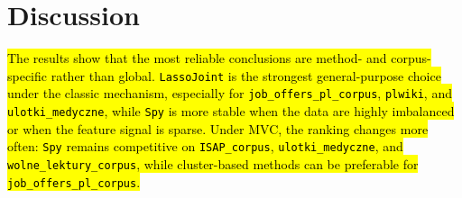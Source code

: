\documentclass[applsci,article,submit,pdftex,moreauthors]{Definitions/mdpi}
\newcommand{\rev}[1]{\hl{#1}}
\begin{document}
\begin{table}[htbp]
\caption{Benchmark Results Summary (\texttt{classic}): average F1 over $c_{calc} \in \{0.2, 0.5, 0.8\}$.}
\label{tab:benchmark_summary_classic}
\centering
\small
{}
\end{table}

\section{Discussion}

\rev{The results show that the most reliable conclusions are method- and corpus-specific rather than global. \texttt{LassoJoint} is the strongest general-purpose choice under the classic mechanism, especially for \texttt{job\_offers\_pl\_corpus}, \texttt{plwiki}, and \texttt{ulotki\_medyczne}, while \texttt{Spy} is more stable when the data are highly imbalanced or when the feature signal is sparse. Under MVC, the ranking changes more often: \texttt{Spy} remains competitive on \texttt{ISAP\_corpus}, \texttt{ulotki\_medyczne}, and \texttt{wolne\_lektury\_corpus}, while cluster-based methods can be preferable for \texttt{job\_offers\_pl\_corpus}.}
\end{document}
